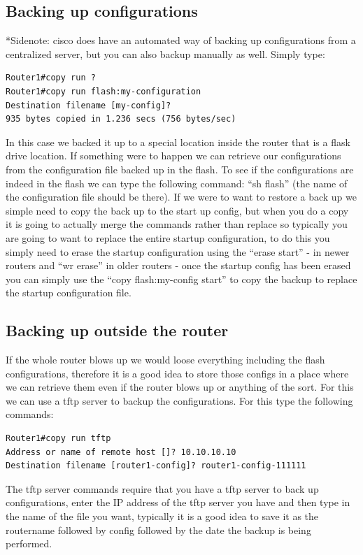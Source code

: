 \subsection{Backing up configurations}
*Sidenote: cisco does have an automated way of backing up configurations from a centralized server, but you can also backup manually as well.
Simply type: 
\begin{verbatim}
Router1#copy run ?
Router1#copy run flash:my-configuration
Destination filename [my-config]? 
935 bytes copied in 1.236 secs (756 bytes/sec)
\end{verbatim}
In this case we backed it up to a special location inside the router that is a flask drive location. If something were to happen we can retrieve our configurations from the configuration file backed up in the flash. To see if the configurations are indeed in the flash we can type the following command: ``sh flash'' (the name of the configuration file should be there). If we were to want to restore a back up we simple need to copy the back up to the start up config, but when you do a copy it is going to actually merge the commands rather than replace so typically you are going to want to replace the entire startup configuration, to do this you simply need to erase the startup configuration using the ``erase start'' - in newer routers and ``wr erase'' in older routers - once the startup config has been erased you can simply use the ``copy flash:my-config start'' to copy the backup to replace the startup configuration file.

\subsection{Backing up outside the router}
If the whole router blows up we would loose everything including the flash configurations, therefore it is a good idea to store those configs in a place where we can retrieve them even if the router blows up or anything of the sort. For this we can use a tftp server to backup the configurations. For this type the following commands:
\begin{verbatim}
Router1#copy run tftp
Address or name of remote host []? 10.10.10.10
Destination filename [router1-config]? router1-config-111111
\end{verbatim}
The tftp server commands require that you have a tftp server to back up configurations, enter the IP address of the tftp server you have and then type in the name of the file you want, typically it is a good idea to save it as the routername followed by config followed by the date the backup is being performed.

